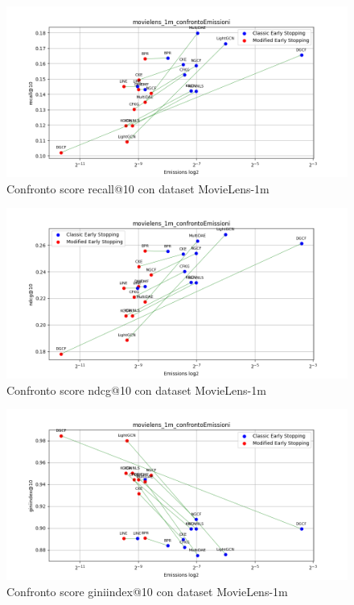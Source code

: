 \begin{figure}[H]
    \centering
    \includegraphics[width=\linewidth, trim=0 0 0 0]{images/recall@10_movielens_1m_comparison.png}
    \caption{Confronto score recall@10 con dataset MovieLens-1m}
    
\end{figure}

\begin{figure}[H]
    \centering
    \includegraphics[width=\linewidth, trim=0 0 0 0]{images/ndcg@10_movielens_1m_comparison.png}
    \caption{Confronto score ndcg@10 con dataset MovieLens-1m}
    
\end{figure}

\begin{figure}[H]
    \centering
    \includegraphics[width=\linewidth, trim=0 0 0 0]{images/giniindex@10_movielens_1m_comparison.png}
    \caption{Confronto score giniindex@10 con dataset MovieLens-1m}
\end{figure}

